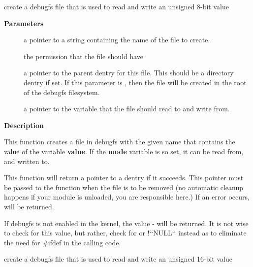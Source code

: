\documentclass[a4paper,8pt,english]{sphinxmanual}
\begin{document}
\begin{fulllineitems}
\label{filesystems/index:c.debugfs_create_u8}
create a debugfs file that is used to read and write an unsigned 8-bit value

\end{fulllineitems}


\textbf{Parameters}
\begin{description}
\item[{}] \leavevmode
a pointer to a string containing the name of the file to create.

\item[{}] \leavevmode
the permission that the file should have

\item[{}] \leavevmode
a pointer to the parent dentry for this file.  This should be a
directory dentry if set.  If this parameter is , then the
file will be created in the root of the debugfs filesystem.

\item[{}] \leavevmode
a pointer to the variable that the file should read to and write
from.

\end{description}

\textbf{Description}

This function creates a file in debugfs with the given name that
contains the value of the variable \textbf{value}.  If the \textbf{mode} variable is so
set, it can be read from, and written to.

This function will return a pointer to a dentry if it succeeds.  This
pointer must be passed to the {\hyperref[filesystems/index:c.debugfs_remove]{\emph{}}} function when the file is
to be removed (no automatic cleanup happens if your module is unloaded,
you are responsible here.)  If an error occurs,  will be returned.

If debugfs is not enabled in the kernel, the value - will be
returned.  It is not wise to check for this value, but rather, check for
 or !{}`{}`NULL{}`{}` instead as to eliminate the need for \#ifdef in the calling
code.

\begin{fulllineitems}
\label{filesystems/index:c.debugfs_create_u16}
create a debugfs file that is used to read and write an unsigned 16-bit value

\end{fulllineitems}
\end{document}
